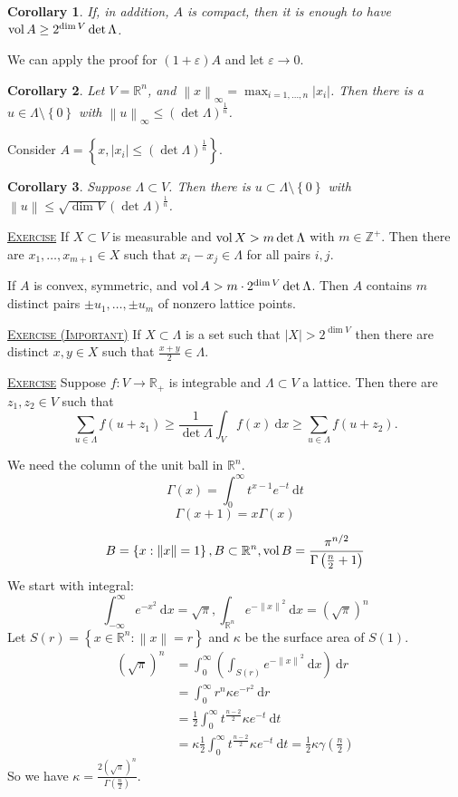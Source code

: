 \documentclass{report}
\newcommand{\R}{\mathbb{R}}
\newcommand{\Z}{\mathbb{Z}}
\newcommand{\df}{\mathrm{d}}
\newcommand{\idf}{\ \mathrm{d}}
\newcommand{\norm}[1]{\left\| #1 \right\|}
\newcommand{\set}[1]{\left\{ #1 \right\}}
\newcommand{\fancyem}[1]{\underline{\textsc{#1}}}
\newtheorem{corollary}{Corollary}[section]
\theoremstyle{definition}
\theoremstyle{remark}
\numberwithin{equation}{section}
\begin{document}
\begin{corollary}
    If, in addition, $A$ is compact, then it is enough to have $\operatorname{vol} A \geq 2^{\dim V} \det \Lambda$.
\end{corollary}
We can apply the proof for $(1 + \varepsilon)A$ and let $\varepsilon \to 0$.

\begin{corollary}
    Let $V = \R^n$, and $\norm{x}_\infty = \max_{i=1, \ldots, n} |x_i|$. Then there is a $u \in \Lambda \setminus \set{0}$ with $\norm{u}_\infty \leq (\det \Lambda)^{\frac{1}{n}}$.
\end{corollary}
Consider $A = \set{x, |x_i| \leq (\det \Lambda)^{\frac{1}{n}}}$.
\begin{corollary}
    Suppose $\Lambda \subset V$. Then there is $u \subset \Lambda \setminus \set{0}$ with $\norm{u} \leq \sqrt{\dim V}(\det \Lambda)^{\frac{1}{n}}$.
\end{corollary}

\fancyem{Exercise} If $X \subset V$ is measurable and $\operatorname{vol} X > m\det \Lambda$ with $m \in \Z^+$. Then there are $x_1, \ldots, x_{m+1} \in X$ such that $x_i - x_j \in \Lambda$ for all pairs $i, j$.

If $A$ is convex, symmetric, and $\operatorname{vol} A > m \cdot 2^{\dim V} \det \Lambda$. Then $A$ contains $m$ distinct pairs $\pm u_1, \ldots, \pm u_m$ of nonzero lattice points.

\fancyem{Exercise (Important)} If $X \subset \Lambda$ is a set such that $|X| > 2^{\dim V}$ then there are distinct $x, y \in X$ such that $\frac{x+y}{2} \in \Lambda$.

\fancyem{Exercise} Suppose $f: V \to \R_+$ is integrable and $\Lambda \subset V$ a lattice. Then there are $z_1, z_2 \in V$ such that \[\sum_{u \in \Lambda} f(u+z_1) \geq \frac{1}{\det\Lambda}\int_V f(x)\ \df x \geq \sum_{u \in \Lambda}f(u+z_2).\]


We need the column of the unit ball in $\R^n$.
\[\Gamma(x) = \int_0^\infty t^{x-1}e^{-t}\idf t\]
\[\Gamma(x+1) = x\Gamma(x)\]

\[B = \set{x: \norm{x} = 1}, B \subset \R^n, \vol B = \frac{\pi^{n/2}}{\Gamma\left(\frac{n}{2}+1\right)}\]
We start with integral:
\[\int_{-\infty}^\infty e^{-x^2}\idf x = \sqrt{\pi}, \int_{\R^n} e^{-\norm{x}^2}\idf x = \left(\sqrt{\pi}\right)^n\]
Let $S(r) = \set{x \in \R^n: \norm{x} = r}$ and $\kappa$ be the surface area of $S(1)$.
\begin{align*}
    \left(\sqrt{\pi}\right)^n & = \int_{0}^\infty \left(\int_{S(r)} e^{-\norm{x}^2} \idf x\right) \idf r \\
    & = \int_0^\infty r^n\kappa e^{-r^2}\idf r \\
    & = \frac{1}{2}\int_0^\infty t^{\frac{n-2}{2}}\kappa e^{-t}\idf t \\
    & = \kappa \frac{1}{2} \int_0^\infty t^{\frac{n-2}{2}}\kappa e^{-t}\idf t = \frac{1}{2}\kappa \gamma\left(\frac{n}{2}\right)
\end{align*}
So we have $\kappa = \frac{2\left(\sqrt{\pi}\right)^n}{\Gamma\left(\frac{n}{2}\right)}$.
\end{document}
